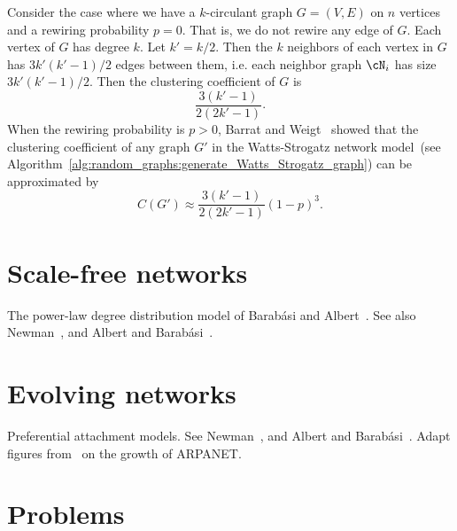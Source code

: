 Consider the case where we have a $k$-circulant graph
$G = (V,E)$ on $n$ vertices and a rewiring probability $p = 0$. That
is, we do not rewire any edge of $G$. Each vertex of $G$ has degree
$k$. Let  $k' = k/2$. Then the $k$ neighbors of each vertex in $G$ has
$3k' (k' - 1) / 2$ edges between them, i.e. each neighbor graph
$\cN_i$ has size $3k' (k' - 1) / 2$. Then the clustering coefficient
of $G$ is
\[
\frac{3(k' - 1)} {2(2k' - 1)}.
\]
When the rewiring probability is $p > 0$, Barrat and
Weigt~\cite{BarratWeigt2000} showed that the clustering coefficient of
any graph $G'$ in the Watts-Strogatz network model~(see
Algorithm~\ref{alg:random_graphs:generate_Watts_Strogatz_graph}) can
be approximated by
\[
C(G')
\approx
\frac{3(k' - 1)} {2(2k' - 1)} (1 - p)^3.
\]



\section{Scale-free networks}

The power-law degree distribution model of Barab{\'a}si and
Albert~\cite{BarabasiAlbert1999}. See also Newman~\cite{Newman2003b},
and Albert and Barab{\'a}si~\cite{AlbertBarabasi2002}.



\section{Evolving networks}

Preferential attachment models. See Newman~\cite{Newman2003b},
and Albert and Barab{\'a}si~\cite{AlbertBarabasi2002}. Adapt figures
from~\cite{HeartEtAl1978} on the growth of ARPANET.



\section{Problems}

